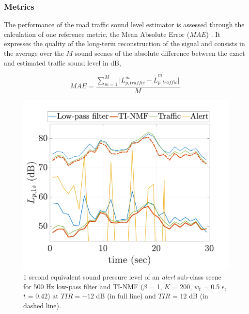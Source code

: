 \documentclass[twocolumn]{svjour3}          %
\begin{document}
\subsubsection{Metrics}

The performance of the road traffic sound level estimator is assessed through the calculation of one reference metric, the Mean Absolute Error ($MAE$) \cite{willmott2005advantages}. It expresses the quality of the long-term reconstruction of the signal and consists in the average over the $M$ sound scenes of the absolute difference between the exact and estimated traffic sound level in dB,

\begin{equation}
MAE = \frac{\sum_{m = 1}^M\vert L^m_{p,traffic}-\tilde{L}^m_{p,traffic} \vert}{M}.
\end{equation}

\begin{figure}[t]
  \centering
	\includegraphics[width=\linewidth]{figures/NMF_Lp_alert.pdf}
 \caption{1 second equivalent sound pressure level of an \textit{alert} sub-class scene for 500 Hz low-pass filter and TI-NMF ($\beta$ = 1, $K$ = 200, $w_t$ = 0.5 s, $t$ = 0.42) at $TIR = -12$ dB (in full line) and $TIR$ = 12 dB (in dashed line).}
	\label{fig:lp_alert}
\end{figure}
\end{document}
